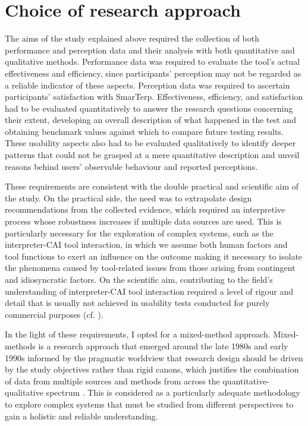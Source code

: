 \section{Choice of research approach}

The aims of the study explained above required the collection of both performance and perception data and their analysis with both quantitative and qualitative methods. Performance data was required to evaluate the tool’s actual effectiveness and efficiency, since participants’ perception may not be regarded as a reliable indicator of these aspects. Perception data was required to ascertain participants’ satisfaction with SmarTerp. Effectiveness, efficiency, and satisfaction had to be evaluated quantitatively to answer the research questions concerning their extent, developing an overall description of what happened in the test and obtaining benchmark values against which to compare future testing results. These usability aspects also had to be evaluated qualitatively to identify deeper patterns that could not be grasped at a mere quantitative description and unveil reasons behind users’ observable behaviour and reported perceptions.

These requirements are consistent with the double practical and scientific aim of the study. On the practical side, the need was to extrapolate design recommendations from the collected evidence, which required an interpretive process whose robustness increases if multiple data sources are used. This is particularly necessary for the exploration of complex systems, such as the interpreter-CAI tool interaction, in which we assume both human factors and tool functions to exert an influence on the outcome making it necessary to isolate the phenomena caused by tool-related issues from those arising from contingent and idiosyncratic factors. On the scientific aim, contributing to the field’s understanding of interpreter-CAI tool interaction required a level of rigour and detail that is usually not achieved in usability tests conducted for purely commercial purposes (cf. \cite{barnum2020usability}).

\begin{sloppypar}
In the light of these requirements, I opted for a mixed-method approach. Mixed\hyp{}methods is a research approach that emerged around the late 1980s and early 1990s informed by the pragmatic worldview that research design should be driven by the study objectives rather than rigid canons, which justifies the combination of data from multiple sources and methods from across the quan\-ti\-ta\-tive\nobreakdash-qual\-i\-ta\-tive spectrum \citep[294--324]{creswell2017research}. This is considered as a particularly adequate methodology to explore complex systems that must be studied from different perspectives to gain a holistic and reliable understanding.
\end{sloppypar}

